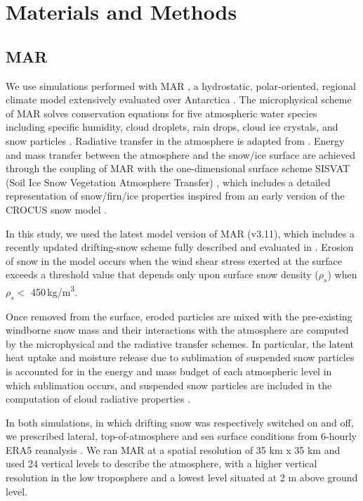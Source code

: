 \documentclass[draft]{agujournal2019}
\begin{document}
\section{Materials and Methods}

\subsection{MAR}
We use simulations performed with MAR \cite{Fettweis2013a, Hofer2020}, a hydrostatic, polar-oriented, regional climate model extensively evaluated over Antarctica \cite{Agosta2019, Mottram2020, Kittel2021} . The microphysical scheme of MAR solves conservation equations for five atmospheric water species including specific humidity, cloud droplets, rain drops, cloud ice crystals, and snow particles \cite{Gallee1994}. Radiative transfer in the atmosphere is adapted from . Energy and mass transfer between the atmosphere and the snow/ice surface are achieved through the coupling of MAR with the one-dimensional surface scheme SISVAT (Soil Ice Snow Vegetation Atmosphere Transfer) \cite{DeRidder1998, Gallee1997, Gallee2001}, which includes a detailed representation of snow/firn/ice properties inspired from an early version of the CROCUS snow model \cite{Brun1992}.

In this study, we used the latest model version of MAR (v3.11), which includes a recently updated drifting-snow scheme fully described and evaluated in . Erosion of snow in the model occurs when the wind shear stress exerted at the surface exceeds a threshold value that depends only upon surface snow density ($\rho_{s}$) when $\rho_{s} <$  450\,kg/m\textsuperscript{3}.

Once removed from the surface, eroded particles are mixed with the pre-existing windborne snow mass and their interactions with the atmosphere are computed by the microphysical and the radiative transfer schemes. In particular, the latent heat uptake and moisture release due to sublimation of suspended snow particles is accounted for in the energy and mass budget of each atmospheric level in which sublimation occurs, and suspended snow particles are included in the computation of cloud radiative properties \cite{Gallee2010}. 

In both simulations, in which drifting snow was respectively switched on and off, we prescribed lateral, top-of-atmosphere and sea surface conditions from 6-hourly ERA5 reanalysis \cite{Hersbach2020}. We ran MAR at a spatial resolution of 35 km x 35 km and used 24 vertical levels to describe the atmosphere, with a higher vertical resolution in the low troposphere and a lowest level situated at 2 m above ground level.
\end{document}
